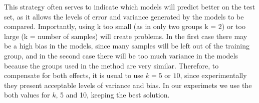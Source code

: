 This strategy often serves to indicate which models will predict better on the test set, as it allows the levels of error and variance generated by the models to be compared. Importantly, using k too small (as in only two groups k = 2) or too large (k = number of samples) will create problems. In the first case there may be a high bias in the models, since many samples will be left out of the training group, and in the second case there will be too much variance in the models because the groups used in the method are very similar. Therefore, to compensate for both effects, it is usual to use $k = 5$ or $10$, since experimentally they present acceptable levels of variance and bias. In our experimets we use the both values for $k$, 5 and 10, keeping the best solution. 

